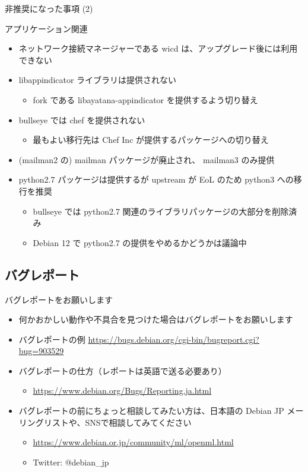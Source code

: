 \begin{frame}{非推奨になった事項 (2)}%

アプリケーション関連
  
\begin{itemize}
\item ネットワーク接続マネージャーである wicd は、アップグレード後には利用できない
\item libappindicator ライブラリは提供されない
  \begin{itemize}
  \item fork である libayatana-appindicator を提供するよう切り替え
  \end{itemize}  
\item bullseye では chef を提供されない
  \begin{itemize}
  \item 最もよい移行先は Chef Inc が提供するパッケージへの切り替え
  \end{itemize}
\item (mailman2 の) mailman パッケージが廃止され、 mailman3 のみ提供
\item python2.7 パッケージは提供するが upstream が EoL のため python3 への移行を推奨
  \begin{itemize}
  \item bullseye では python2.7 関連のライブラリパッケージの大部分を削除済み
  \item Debian 12 で python2.7 の提供をやめるかどうかは議論中
  \end{itemize}
\end{itemize}

\end{frame}


\subsection{バグレポート}

\begin{frame}{バグレポートをお願いします}%
  \begin{itemize}
  \item 何かおかしい動作や不具合を見つけた場合はバグレポートをお願いします
  \item バグレポートの例 \url{https://bugs.debian.org/cgi-bin/bugreport.cgi?bug=903529}
  \item バグレポートの仕方（レポートは英語で送る必要あり）
    \begin{itemize}
    \item \url{https://www.debian.org/Bugs/Reporting.ja.html}
    \end{itemize}
  \item バグレポートの前にちょっと相談してみたい方は、日本語の Debian JP メーリングリストや、SNSで相談してみてください
    \begin{itemize}
    \item \url{https://www.debian.or.jp/community/ml/openml.html}
    \item Twitter: @debian\_jp
    \end{itemize}
  \end{itemize}
\end{frame}

